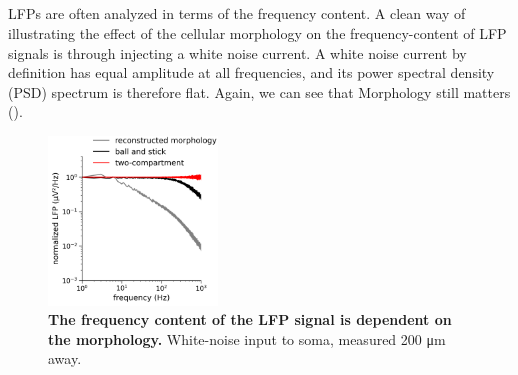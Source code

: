 \subsection{}

LFPs are often analyzed in terms of the frequency content.
A clean way of illustrating the effect of the cellular morphology on the frequency-content of LFP signals
is through injecting a white noise current. A white noise current by definition has equal amplitude at all frequencies, and its power spectral density (PSD) spectrum is therefore flat.
Again, we can see that Morphology still matters ().

\begin{figure}[!ht]
\begin{center}
\includegraphics[width=0.4\textwidth]{Figures/LFP/fig_LFP_powerlaws_morphology.png}
\end{center}
\caption{\textbf{The frequency content of the LFP signal is dependent on the morphology.}
White-noise input to soma, measured 200 \si{\micro \metre} away.
}
\label{fig:LFP:morph_matters_PSD}
\end{figure}




